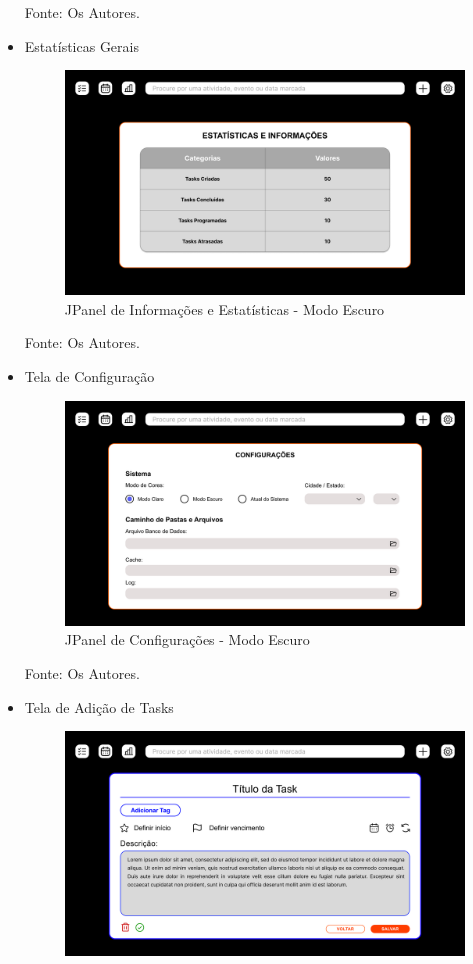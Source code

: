 \documentclass[a4paper,12pt]{article}
\begin{document}
\begin{itemize}
	\noindent Fonte: Os Autores.
	\pagebreak
	\item Estatísticas Gerais
	\begin{figure}[H]
		\centering
		\includegraphics[scale=0.20]{prototypes/dark/Stats Panel Window.png}
		\caption{JPanel de Informações e Estatísticas - Modo Escuro}
	\end{figure}
	\noindent Fonte: Os Autores.
	\item Tela de Configuração
	\begin{figure}[H]
		\centering
		\includegraphics[scale=0.20]{prototypes/dark/Config Panel Window.png}
		\caption{JPanel de Configurações - Modo Escuro}
	\end{figure}
	\noindent Fonte: Os Autores.
	\pagebreak
	\item Tela de Adição de Tasks
	\begin{figure}[H]
		\centering
		\includegraphics[scale=0.20]{prototypes/dark/Add Task Panel Window.png}

\end{figure}
\end{itemize}
\end{document}
